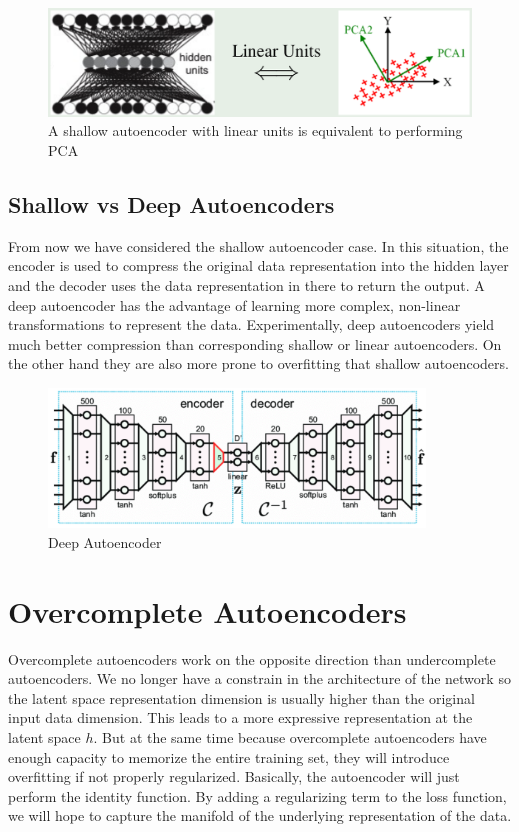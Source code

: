 \begin{figure}[h]
    \centering
    \includegraphics[width=13cm]{Images/pca-autoencoder.png}
    \caption{A shallow autoencoder with linear units is equivalent to performing PCA}
\end{figure}

\subsection{Shallow vs Deep Autoencoders}

From now we have considered the shallow autoencoder case. In this situation, the encoder is used to compress the original data representation into the hidden layer and the decoder uses the data representation in there to return the output. A deep autoencoder has the advantage of learning more complex, non-linear transformations to represent the data. Experimentally, deep autoencoders yield much better compression than corresponding shallow or linear autoencoders. On the other hand they are also more prone to overfitting that shallow autoencoders.

\begin{figure}[h]
    \centering
    \includegraphics[width=10cm]{Images/deep-autoencoder.png}
    \caption{Deep Autoencoder}
\end{figure}

\section{Overcomplete Autoencoders}

Overcomplete autoencoders work on the opposite direction than undercomplete autoencoders. We no longer have a constrain in the architecture of the network so the latent space representation dimension is usually higher than the original input data dimension. This leads to a more expressive representation at the latent space $h$. But at the same time because overcomplete autoencoders have enough capacity to memorize the entire training set, they will introduce overfitting if not properly regularized. Basically, the autoencoder will just perform the identity function. By adding a regularizing term to the loss function, we will hope to capture the manifold of the underlying representation of the data.

